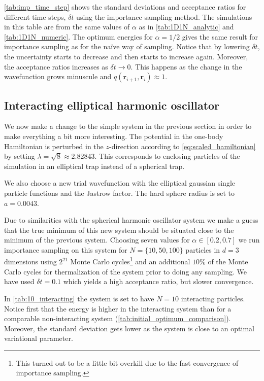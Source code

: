 \documentclass[
    a4paper, aps, twocolumn, floatfix, superscriptaddress,
    nofootinbib]{revtex4-1}
\newcommand{\vf}{\mathbf}
\newcommand{\1}{\mathds{1}}
\begin{document}
            \autoref{tab:imp_time_step} shows the standard deviations and
            acceptance ratios for different time steps, $\delta t$ using the
            importance sampling method. The simulations in this table are from
            the same values of $\alpha$ as in \autoref{tab:1D1N_analytic} and
            \autoref{tab:1D1N_numeric}. The optimum energies for $\alpha = 1/2$
            gives the same result for importance sampling as for the naïve way
            of sampling. Notice that by lowering $\delta t$, the uncertainty
            starts to decrease and then starts to increase again. Moreover, the
            acceptance ratios increases as $\delta t \to 0$. This happens as the
            change in the wavefunction grows minuscule and $q(\vf{r}_{i + 1},
            \vf{r}_i) \approx 1$.

    \subsection{Interacting elliptical harmonic oscillator}
        We now make a change to the simple system in the previous section in
        order to make everything a bit more interesting. The potential in the
        one-body Hamiltonian is perturbed in the $z$-direction according to
        \autoref{eq:scaled_hamiltonian} by setting $\lambda = \sqrt{8} \approx
        2.82843$. This corresponds to enclosing particles of the simulation in
        an elliptical trap instead of a spherical trap.

        We also choose a new trial wavefunction with the elliptical gaussian
        single particle functions and the Jastrow factor. The hard sphere radius
        is set to $a = 0.0043$.

        Due to similarities with the spherical harmonic oscillator
        system we make a guess that the true minimum of this new system should
        be situated close to the minimum of the previous system. Choosing seven
        values for $\alpha \in [0.2, 0.7]$ we run importance sampling on this
        system for $N = \{10, 50, 100\}$ particles in $d = 3$ dimensions using
        $2^{21}$ Monte Carlo cycles\footnote{This turned out to be a little bit
        overkill due to the fast convergence of importance sampling.} and an
        additional $10\%$ of the Monte Carlo cycles for thermalization of the
        system prior to doing any sampling. We have used $\delta t = 0.1$ which
        yields a high acceptance ratio, but slower convergence.

        In \autoref{tab:10_interacting} the system is set to have $N = 10$
        interacting particles. Notice first that the energy is higher in
        the interacting system than for a comparable non-interacting system
        (\autoref{tab:initial_optimum_comparison}).  Moreover, the standard
        deviation gets lower as the system is close to an optimal variational
        parameter.
\end{document}
